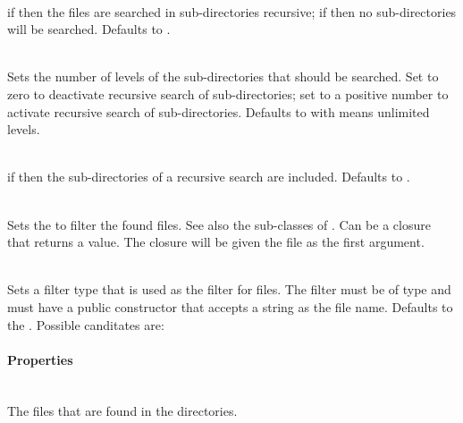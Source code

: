 \begin{asparadesc}
%
\item[\code{recursive: true|false}] \hfill \\
if  then the files are searched in sub-directories recursive;
if  then no sub-directories will be searched. Defaults to .
%
\item[\code{depth: (+)number|-1}] \hfill \\
Sets the number of levels of the sub-directories that should be searched.
Set to zero to deactivate recursive search of sub-directories; set to a positive
number to activate recursive search of sub-directories.
Defaults to  with means unlimited levels.
%
\item[\code{includeSubDirectories: true|false}] \hfill \\
if  then the sub-directories of a recursive search are included.
Defaults to .
%
\item[\code{filter: FileFilter|closure}] \hfill \\
Sets the \cite{filefilter13} to filter the found files.
See also the sub-classes of \cite{abstractfilefilter13}.
Can be a closure that returns a  value. The closure will be given
the file\cite{file13} as the first argument.
%
\item[\code{filterType: class}] \hfill \\
Sets a filter type that is used as the filter for files. The filter 
must be of type \cite{filefilter13} and must have
a public constructor that accepts a string as the file name. Defaults
to the \cite{wildcardfilefilter13}. Possible canditates
are:
\begin{compactitem}
\item {}
\item {}
\item {}
\item {}
\item {}
\end{compactitem}
%
\end{asparadesc}

\paragraph{Properties}

\begin{asparadesc}
%
\item[\code{theFiles}] \hfill \\
The files that are found in the directories.
%
\end{asparadesc}


